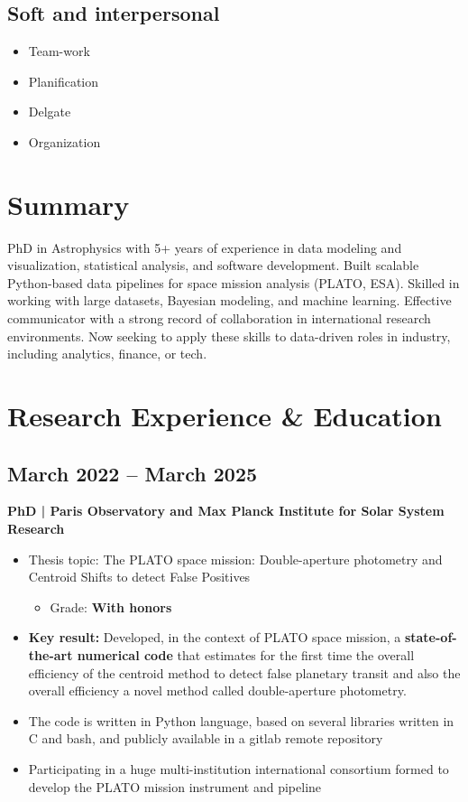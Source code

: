 \documentclass[11pt,a4paper]{article}
\begin{document}
\begin{multicols}{2}
		\subsection{Soft and interpersonal}
		
		\begin{itemize}
			\item Team-work
			\item Planification
			\item Delgate
			\item Organization
		\end{itemize}
		
		\section{Summary}
		PhD in Astrophysics with 5+ years of experience in data modeling and visualization, statistical analysis, and software development. Built scalable Python-based data pipelines for space mission analysis (PLATO, ESA). Skilled in working with large datasets, Bayesian modeling, and machine learning. Effective communicator with a strong record of collaboration in international research environments. Now seeking to apply these skills to data-driven roles in industry, including analytics, finance, or tech.
		
		\section{Research Experience \& Education}
		
		
		\subsection{March 2022 – March 2025}
		\textbf{PhD | Paris Observatory and Max Planck Institute for Solar System Research}
		\begin{itemize}
			\item Thesis topic: The PLATO space mission: Double-aperture photometry and Centroid Shifts to detect False Positives
			\begin{itemize}
				\item Grade: \textbf{With honors}
			\end{itemize}
			\item \textbf{Key result:} Developed, in the context of PLATO space mission, a \textbf{state-of-the-art numerical code} that estimates for the first time the overall efficiency of the centroid method to detect false planetary transit and also the overall efficiency a novel method called double-aperture photometry.
			\item The code is written in Python language, based on several libraries written in C and bash, and publicly available in a gitlab remote repository
			\item Participating in a huge multi-institution international consortium formed to develop the PLATO mission instrument and pipeline
		\end{itemize}
		

\end{multicols}
\end{document}
